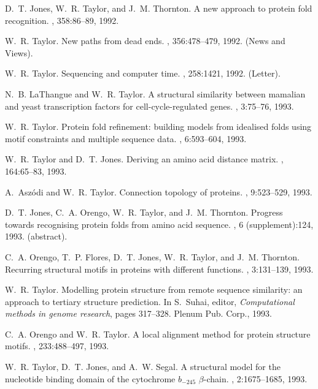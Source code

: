 \begin{thebibliography}{100}
D.~T. Jones, W.~R. Taylor, and J.~M. Thornton.
\newblock A new approach to protein fold recognition.
, 358:86--89, 1992.

W.~R. Taylor.
\newblock New paths from dead ends.
, 356:478--479, 1992.
\newblock (News and Views).

W.~R. Taylor.
\newblock Sequencing and computer time.
, 258:1421, 1992.
\newblock (Letter).

N.~B. LaThangue and W.~R. Taylor.
\newblock A structural similarity between mamalian and yeast transcription
  factors for cell-cycle-regulated genes.
, 3:75--76, 1993.

W.~R. Taylor.
\newblock Protein fold refinement: building models from idealised folds using
  motif constraints and multiple sequence data.
, 6:593--604, 1993.

W.~R. Taylor and D.~T. Jones.
\newblock Deriving an amino acid distance matrix.
, 164:65--83, 1993.

A.~Asz\'{o}di and W.~R. Taylor.
\newblock Connection topology of proteins.
, 9:523--529, 1993.

D.~T. Jones, C.~A. Orengo, W.~R. Taylor, and J.~M. Thornton.
\newblock Progress towards recognising protein folds from amino acid sequence.
, 6 (supplement):124, 1993.
\newblock (abstract).

C.~A. Orengo, T.~P. Flores, D.~T. Jones, W.~R. Taylor, and J.~M. Thornton.
\newblock Recurring structural motifs in proteins with different functions.
, 3:131--139, 1993.

W.~R. Taylor.
\newblock Modelling protein structure from remote sequence similarity: an
  approach to tertiary structure prediction.
\newblock In S.~Suhai, editor, {\em Computational methods in genome research},
  pages 317--328. Plenum Pub. Corp., 1993.

C.~A. Orengo and W.~R. Taylor.
\newblock A local alignment method for protein structure motifs.
, 233:488--497, 1993.

W.~R. Taylor, D.~T. Jones, and A.~W. Segal.
\newblock A structural model for the nucleotide binding domain of the
  cytochrome $b_{-245}$ $\beta$-chain.
, 2:1675--1685, 1993.


\end{thebibliography}
